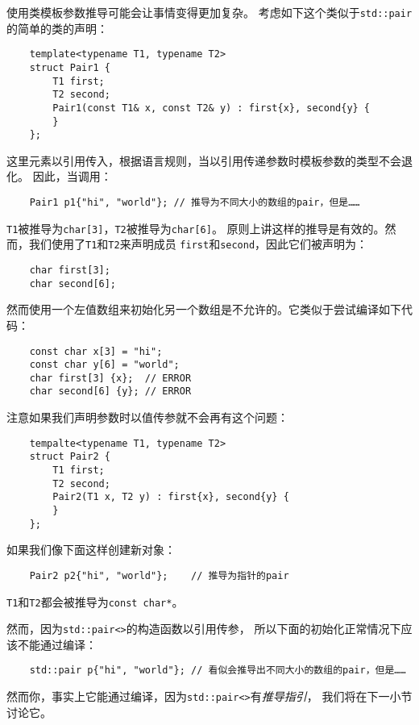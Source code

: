 使用类模板参数推导可能会让事情变得更加复杂。
考虑如下这个类似于\texttt{std::pair}的简单的类的声明：
\begin{lstlisting}
    template<typename T1, typename T2>
    struct Pair1 {
        T1 first;
        T2 second;
        Pair1(const T1& x, const T2& y) : first{x}, second{y} {
        }
    };
\end{lstlisting}
这里元素以引用传入，根据语言规则，当以引用传递参数时模板参数的类型不会退化。
因此，当调用：
\begin{lstlisting}
    Pair1 p1{"hi", "world"}; // 推导为不同大小的数组的pair，但是……
\end{lstlisting}
\texttt{T1}被推导为\texttt{char[3]}，\texttt{T2}被推导为\texttt{char[6]}。
原则上讲这样的推导是有效的。然而，我们使用了\texttt{T1}和\texttt{T2}来声明成员
\texttt{first}和\texttt{second}，因此它们被声明为：
\begin{lstlisting}
    char first[3];
    char second[6];
\end{lstlisting}
然而使用一个左值数组来初始化另一个数组是不允许的。它类似于尝试编译如下代码：
\begin{lstlisting}
    const char x[3] = "hi";
    const char y[6] = "world";
    char first[3] {x};  // ERROR
    char second[6] {y}; // ERROR
\end{lstlisting}
注意如果我们声明参数时以值传参就不会再有这个问题：
\begin{lstlisting}
    tempalte<typename T1, typename T2>
    struct Pair2 {
        T1 first;
        T2 second;
        Pair2(T1 x, T2 y) : first{x}, second{y} {
        }
    };
\end{lstlisting}
如果我们像下面这样创建新对象：
\begin{lstlisting}
    Pair2 p2{"hi", "world"};    // 推导为指针的pair
\end{lstlisting}
\texttt{T1}和\texttt{T2}都会被推导为\texttt{const char*}。

然而，因为\texttt{std::pair<>}的构造函数以引用传参，
所以下面的初始化正常情况下应该不能通过编译：
\begin{lstlisting}
    std::pair p{"hi", "world"}; // 看似会推导出不同大小的数组的pair，但是……
\end{lstlisting}
然而你，事实上它能通过编译，因为\texttt{std::pair<>}有\emph{推导指引}，
我们将在下一小节讨论它。

